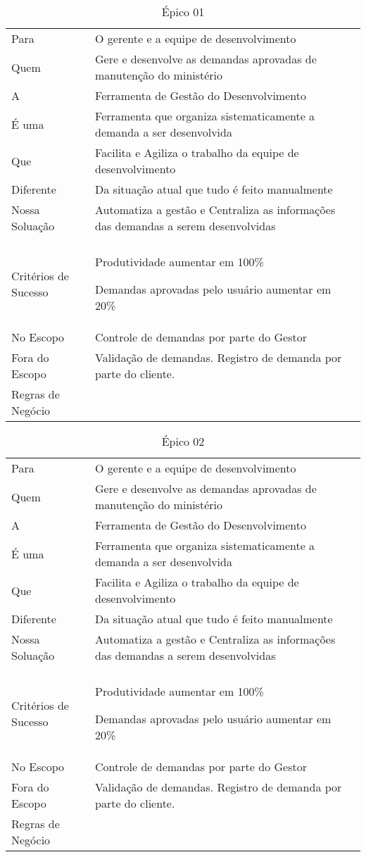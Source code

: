 \begin{table}[H]
	\begin{tabular}{|>{\raggedright}p{4cm}|>{\raggedright}p{10cm}|}
		\hline
		\multicolumn{2}{|c|}{Caso de Negócio}\tabularnewline
		\hline
		Para & O gerente e a equipe de desenvolvimento\tabularnewline
		\hline
		Quem & Gere e desenvolve as demandas aprovadas de manutenção do ministério\tabularnewline
		\hline
		A & Ferramenta de Gestão do Desenvolvimento\tabularnewline
		\hline
		É uma & Ferramenta que organiza sistematicamente a demanda a ser desenvolvida\tabularnewline
		\hline
		Que & Facilita e Agiliza o trabalho da equipe de desenvolvimento\tabularnewline
		\hline
		Diferente & Da situação atual que tudo é feito manualmente\tabularnewline
		\hline
		Nossa Soluação & Automatiza a gestão e Centraliza as informações das demandas a serem
		desenvolvidas\tabularnewline
		\hline
		\multicolumn{2}{|c|}{Escopo}\tabularnewline
		\hline
		Critérios de Sucesso & Produtividade aumentar em 100\%

		Demandas aprovadas pelo usuário aumentar em 20\%\tabularnewline
		\hline
		No Escopo & Controle de demandas por parte do Gestor\tabularnewline
		\hline
		Fora do Escopo & Validação de demandas. Registro de demanda por parte do cliente.\tabularnewline
		\hline
		Regras de Negócio & \tabularnewline
		\hline
	\end{tabular}
	\caption{Épico 01}
	\label{Epico_01}
\end{table}

\begin{table}[H]
	\begin{tabular}{|>{\raggedright}p{4cm}|>{\raggedright}p{10cm}|}
		\hline
		\multicolumn{2}{|c|}{Caso de Negócio}\tabularnewline
		\hline
		Para & O gerente e a equipe de desenvolvimento\tabularnewline
		\hline
		Quem & Gere e desenvolve as demandas aprovadas de manutenção do ministério\tabularnewline
		\hline
		A & Ferramenta de Gestão do Desenvolvimento\tabularnewline
		\hline
		É uma & Ferramenta que organiza sistematicamente a demanda a ser desenvolvida\tabularnewline
		\hline
		Que & Facilita e Agiliza o trabalho da equipe de desenvolvimento\tabularnewline
		\hline
		Diferente & Da situação atual que tudo é feito manualmente\tabularnewline
		\hline
		Nossa Soluação & Automatiza a gestão e Centraliza as informações das demandas a serem
		desenvolvidas\tabularnewline
		\hline
		\multicolumn{2}{|c|}{Escopo}\tabularnewline
		\hline
		Critérios de Sucesso & Produtividade aumentar em 100\%

		Demandas aprovadas pelo usuário aumentar em 20\%\tabularnewline
		\hline
		No Escopo & Controle de demandas por parte do Gestor\tabularnewline
		\hline
		Fora do Escopo & Validação de demandas. Registro de demanda por parte do cliente.\tabularnewline
		\hline
		Regras de Negócio & \tabularnewline
		\hline
	\end{tabular}
	\caption{Épico 02}
	\label{Epico_02}
\end{table}

